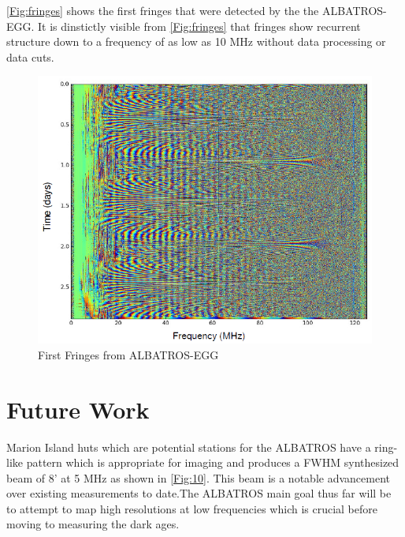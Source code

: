 \documentclass{ws-jai}
\begin{document}
\autoref{Fig:fringes} shows the first fringes that were detected by the the ALBATROS-EGG. It is dinstictly visible from \autoref{Fig:fringes} that fringes show recurrent structure down to a frequency of as low as 10 MHz without data processing or data cuts.

\begin{figure}[ht!]
	\begin{center}
		\includegraphics[width=0.7\linewidth]{Figures/First-fringes-of-ALBATROS-EGG.PNG}
		\caption{First Fringes from ALBATROS-EGG}
		\label{Fig:fringes}
	\end{center}
\end{figure}


		
\section{Future Work}

Marion Island huts which are potential stations for the ALBATROS have a ring-like pattern which is appropriate for imaging and produces a FWHM synthesized beam of 8' at 5 MHz as shown in \autoref{Fig:10}. This beam is a notable advancement over existing measurements to date.The ALBATROS main goal thus far will be to attempt to map high resolutions at low frequencies which is crucial before moving to measuring the dark ages.
\end{document}
